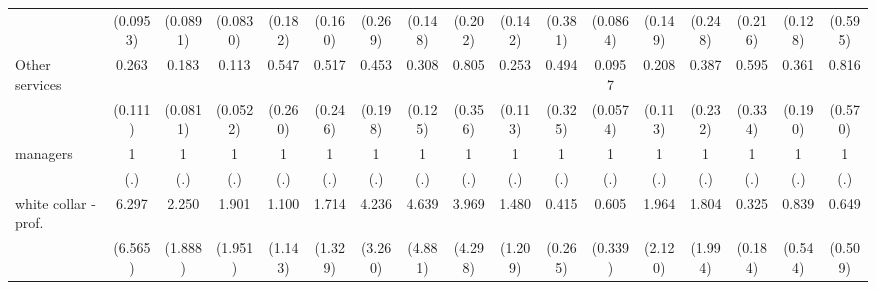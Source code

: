 {\begin{tabular}{l*{16}{c}}
                    &    (0.0953)         &    (0.0891)         &    (0.0830)         &     (0.182)         &     (0.160)         &     (0.269)         &     (0.148)         &     (0.202)         &     (0.142)         &     (0.381)         &    (0.0864)         &     (0.149)         &     (0.248)         &     (0.216)         &     (0.128)         &     (0.595)         \\
[1em]
Other services      &       0.263\sym{**} &       0.183\sym{***}&       0.113\sym{***}&       0.547         &       0.517         &       0.453         &       0.308\sym{**} &       0.805         &       0.253\sym{**} &       0.494         &      0.0957\sym{***}&       0.208\sym{**} &       0.387         &       0.595         &       0.361         &       0.816         \\
                    &     (0.111)         &    (0.0811)         &    (0.0522)         &     (0.260)         &     (0.246)         &     (0.198)         &     (0.125)         &     (0.356)         &     (0.113)         &     (0.325)         &    (0.0574)         &     (0.113)         &     (0.232)         &     (0.334)         &     (0.190)         &     (0.570)         \\
[1em]
managers            &           1         &           1         &           1         &           1         &           1         &           1         &           1         &           1         &           1         &           1         &           1         &           1         &           1         &           1         &           1         &           1         \\
                    &         (.)         &         (.)         &         (.)         &         (.)         &         (.)         &         (.)         &         (.)         &         (.)         &         (.)         &         (.)         &         (.)         &         (.)         &         (.)         &         (.)         &         (.)         &         (.)         \\
[1em]
white collar - prof.&       6.297         &       2.250         &       1.901         &       1.100         &       1.714         &       4.236         &       4.639         &       3.969         &       1.480         &       0.415         &       0.605         &       1.964         &       1.804         &       0.325\sym{*}  &       0.839         &       0.649         \\
                    &     (6.565)         &     (1.888)         &     (1.951)         &     (1.143)         &     (1.329)         &     (3.260)         &     (4.881)         &     (4.298)         &     (1.209)         &     (0.265)         &     (0.339)         &     (2.120)         &     (1.994)         &     (0.184)         &     (0.544)         &     (0.509)         \\

\end{tabular}}
